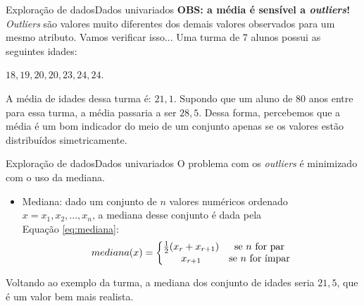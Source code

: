 \documentclass[t]{beamer}
\begin{document}

\begin{ftst}{Exploração de dados}{Dados univariados}
\textbf{OBS: a média é sensível a \textit{outliers}!}
\vone
\textit{Outliers} são valores muito diferentes dos demais valores observados para um mesmo atributo. Vamos verificar isso...
\vone
Uma turma de 7 alunos possui as seguintes idades: \\
\begin{center}
    ${18,19,20,20,23,24,24}$.\\
\end{center}

A média de idades dessa turma é: $21,1$.
\vone
Supondo que um aluno de 80 anos entre para essa turma, a média passaria a ser $28,5$. 
\vone
Dessa forma, percebemos que a média é um bom indicador do meio de um conjunto apenas se os valores estão distribuídos simetricamente.
\end{ftst}


\begin{ftst}{Exploração de dados}{Dados univariados}
O problema com os \textit{outliers} é minimizado com o uso da mediana.
\vone
\begin{itemize}
    \item Mediana: dado um conjunto de $n$ valores numéricos ordenado $x = {x_1, x_2, ..., x_n}$, a mediana desse conjunto é dada pela \\Equação \ref{eq:mediana}:
    \begin{equation}
        \centering
        mediana(x) = \left\{\begin{matrix}
                        \frac{1}{2}(x_r + x_{r+1}) & 
                        \text{se } n \text{ for par}\\ 
                        x_{r+1} & \text{se } n \text{ for ímpar}
                        \end{matrix}\right.
        \label{eq:mediana}
    \end{equation}
\end{itemize}
\vone
Voltando ao exemplo da turma, a mediana dos conjunto de idades seria $21,5$, que é um valor bem mais realista.

\end{ftst}

\end{document}
